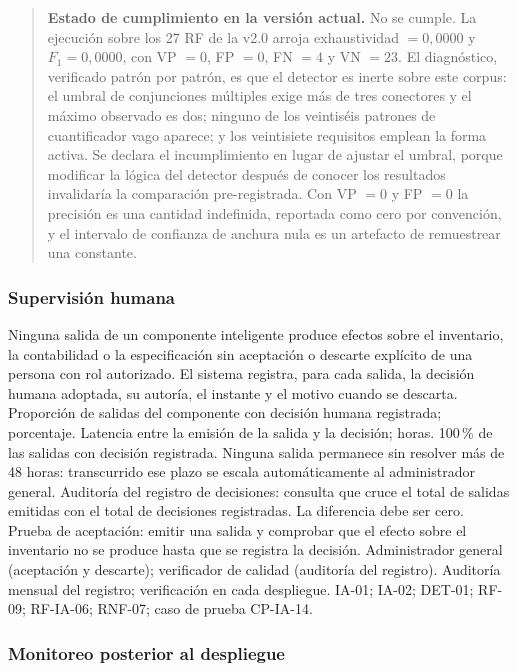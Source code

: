 \documentclass[11pt,a4paper]{article}
\begin{document}
\begin{quote}
\small
\textbf{Estado de cumplimiento en la versión actual.} No se cumple. La
ejecución sobre los 27 RF de la v2.0 arroja exhaustividad $=0{,}0000$ y
$F_1 = 0{,}0000$, con VP $=0$, FP $=0$, FN $=4$ y VN $=23$. El diagnóstico,
verificado patrón por patrón, es que el detector es inerte sobre este corpus:
el umbral de conjunciones múltiples exige más de tres conectores y el máximo
observado es dos; ninguno de los veintiséis patrones de cuantificador vago
aparece; y los veintisiete requisitos emplean la forma activa. Se declara el
incumplimiento en lugar de ajustar el umbral, porque modificar la lógica del
detector después de conocer los resultados invalidaría la comparación
pre-registrada. Con VP $=0$ y FP $=0$ la precisión es una cantidad indefinida,
reportada como cero por convención, y el intervalo de confianza de anchura
nula es un artefacto de remuestrear una constante.
\end{quote}

\subsubsection{Supervisión humana}

{Ninguna salida de un componente inteligente produce efectos sobre el
inventario, la contabilidad o la especificación sin aceptación o descarte
explícito de una persona con rol autorizado. El sistema registra, para cada
salida, la decisión humana adoptada, su autoría, el instante y el motivo
cuando se descarta.}
{Proporción de salidas del componente con decisión humana registrada;
porcentaje. Latencia entre la emisión de la salida y la decisión; horas.}
{100\,\% de las salidas con decisión registrada. Ninguna salida permanece sin
resolver más de 48 horas: transcurrido ese plazo se escala automáticamente al
administrador general.}
{Auditoría del registro de decisiones: consulta que cruce el total de salidas
emitidas con el total de decisiones registradas. La diferencia debe ser cero.
Prueba de aceptación: emitir una salida y comprobar que el efecto sobre el
inventario no se produce hasta que se registra la decisión.}
{Administrador general (aceptación y descarte); verificador de calidad
(auditoría del registro).}
{Auditoría mensual del registro; verificación en cada despliegue.}
{IA-01; IA-02; DET-01; RF-09; RF-IA-06; RNF-07; caso de prueba CP-IA-14.}

\subsubsection{Monitoreo posterior al despliegue}
\end{document}
